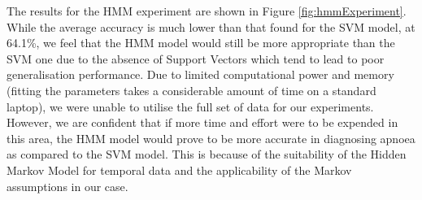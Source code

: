 The results for the HMM experiment are shown in Figure \ref{fig:hmmExperiment}. While the average accuracy is much lower than that found for the SVM model, at 64.1\%, we feel that the HMM model would still be more appropriate than the SVM one due to the absence of Support Vectors which tend to lead to poor generalisation performance. Due to limited computational power and memory (fitting the parameters takes a considerable amount of time on a standard laptop), we were unable to utilise the full set of data for our experiments. However, we are confident that if more time and effort were to be expended in this area, the HMM model would prove to be more accurate in diagnosing apnoea as compared to the SVM model. This is because of the suitability of the Hidden Markov Model for temporal data and the applicability of the Markov assumptions in our case.

